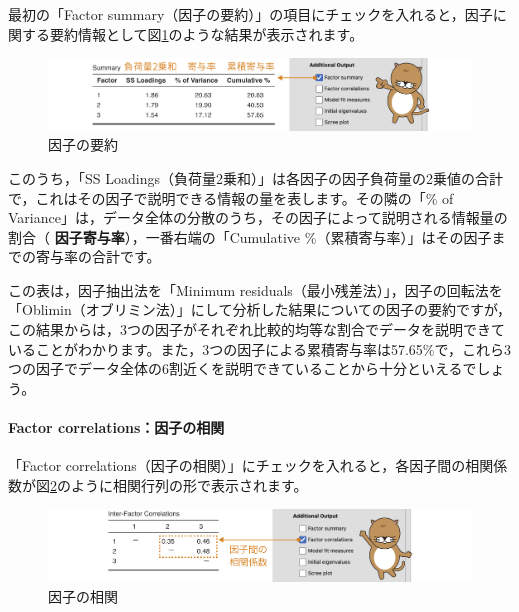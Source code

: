 \documentclass[
  12pt,
  a5jpaper,
  lualatex, ja=standard]{bxjsbook}
\renewcommand{\emph}[1]{\textbf{\color{emph} #1}}
\begin{document}
最初の「Factor summary（因子の要約）」の項目にチェックを入れると，因子に関する要約情報として図\ref{fig:factor-efa-factor-summary}のような結果が表示されます。

\begin{figure}[!ht]

{\centering \includegraphics[width=1\linewidth]{images/factor/efa-factor-summary} 

}

\caption{因子の要約}\label{fig:factor-efa-factor-summary}
\end{figure}

このうち，「SS Loadings（負荷量2乗和）」は各因子の因子負荷量の2乗値の合計で，これはその因子で説明できる情報の量を表します。その隣の「\% of Variance」は，データ全体の分散のうち，その因子によって説明される情報量の割合（\emph{因子寄与率}），一番右端の「Cumulative \%（累積寄与率）」はその因子までの寄与率の合計です。

この表は，因子抽出法を「Minimum residuals（最小残差法）」，因子の回転法を「Oblimin（オブリミン法）」にして分析した結果についての因子の要約ですが，この結果からは，3つの因子がそれぞれ比較的均等な割合でデータを説明できていることがわかります。また，3つの因子による累積寄与率は57.65\%で，これら3つの因子でデータ全体の6割近くを説明できていることから十分といえるでしょう。

\hypertarget{subsub:factor-efa-factor-correlations}{%
\paragraph*{Factor correlations：因子の相関}\label{subsub:factor-efa-factor-correlations}}

「Factor correlations（因子の相関）」にチェックを入れると，各因子間の相関係数が図\ref{fig:factor-efa-factor-correlations}のように相関行列の形で表示されます。

\begin{figure}[!ht]

{\centering \includegraphics[width=1\linewidth]{images/factor/efa-factor-correlations} 

}

\caption{因子の相関}\label{fig:factor-efa-factor-correlations}
\end{figure}
\end{document}
